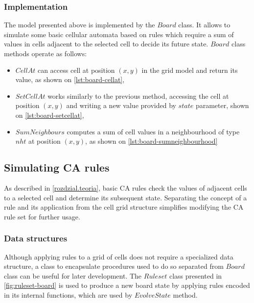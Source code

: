 \documentclass[12pt]{report}
\begin{document}
\subsubsection{Implementation}
 
The model presented above is implemented by the $Board$ class. It allows to simulate some basic cellular automata based on rules which require a sum of values in cells adjacent to the selected cell to decide its future state. $Board$ class methods operate as follows:

\begin{itemize}
	\item $CellAt$ can access cell at position $(x,y)$ in the grid model and return its value, as shown on \cref{lst:board-cellat},
	\item $SetCellAt$ works similarly to the previous method, accessing the cell at position $(x,y)$ and writing a new value provided by $state$ parameter, shown on \cref{lst:board-setcellat},
	\item $SumNeighbours$ computes a sum of cell values in a neighbourhood of type $nht$ at position $(x,y)$, as shown on \cref{lst:board-sumneighbourhood} 
\end{itemize}
 





\subsection{Simulating CA rules} 

As described in \cref{rozdzial.teoria}, basic CA rules check the values of adjacent cells to a selected cell and determine its subsequent state. Separating the concept of a rule and its application from the cell grid structure simplifies modifying the CA rule set for further usage.

\subsubsection{Data structures}

Although applying rules to a grid of cells does not require a specialized data structure, a class to encapsulate procedures used to do so separated from $Board$ class can be useful for later development. The $Ruleset$ class presented in \cref{fig:ruleset-board} is used to produce a new board state by applying rules encoded in its internal functions, which are used by $EvolveState$ method.
\end{document}
